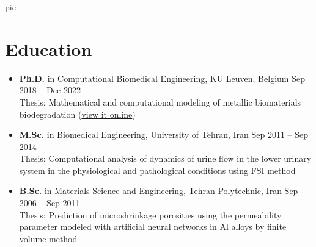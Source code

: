 \documentclass{cv}
\begin{document}
{{pic}}






\section{Education}

\begin{itemize}[itemsep=-0.2ex]
\item
\textbf{Ph.D.} in Computational Biomedical Engineering, KU Leuven, Belgium \hfill Sep 2018 -- Dec 2022
\\
Thesis: Mathematical and computational modeling of metallic biomaterials biodegradation ({\href{https://mbarzegary.github.io/phd-thesis-website/}{view it online}})

\item
\textbf{M.Sc.} in Biomedical Engineering, University of Tehran, Iran \hfill Sep 2011 -- Sep 2014
\\
Thesis: Computational analysis of dynamics of urine flow in the lower urinary system in the physiological and pathological conditions using FSI method 


\item
\textbf{B.Sc.} in Materials Science and Engineering, Tehran Polytechnic, Iran \hfill Sep 2006 -- Sep 2011
\\
Thesis: Prediction of microshrinkage porosities using the permeability parameter modeled with artificial neural networks in Al alloys by finite volume method 

\end{itemize}
\end{document}
